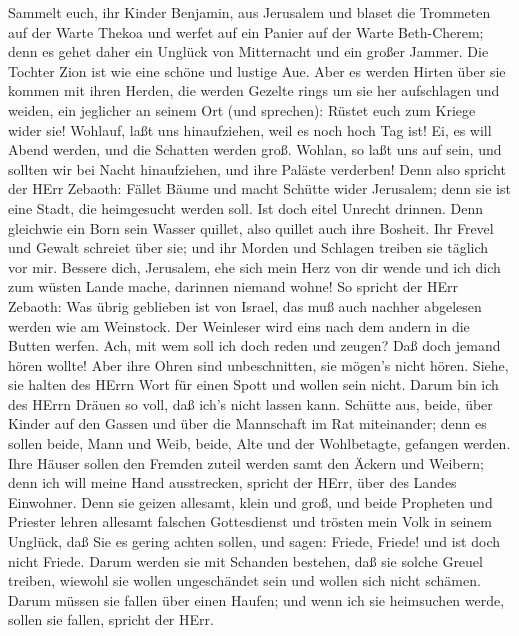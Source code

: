  Sammelt euch, ihr Kinder Benjamin, aus Jerusalem und blaset
die Trommeten auf der Warte Thekoa und werfet auf ein Panier auf der
Warte Beth-Cherem; denn es gehet daher ein Unglück von Mitternacht und
ein großer Jammer.  Die Tochter Zion ist wie eine schöne und
lustige Aue.  Aber es werden Hirten über sie kommen mit
ihren Herden, die werden Gezelte rings um sie her aufschlagen und
weiden, ein jeglicher an seinem Ort (und sprechen):  Rüstet
euch zum Kriege wider sie! Wohlauf, laßt uns hinaufziehen, weil es noch
hoch Tag ist! Ei, es will Abend werden, und die Schatten werden groß.
 Wohlan, so laßt uns auf sein, und sollten wir bei Nacht
hinaufziehen, und ihre Paläste verderben!  Denn also spricht
der HErr Zebaoth: Fället Bäume und macht Schütte wider Jerusalem; denn
sie ist eine Stadt, die heimgesucht werden soll. Ist doch eitel Unrecht
drinnen.  Denn gleichwie ein Born sein Wasser quillet, also
quillet auch ihre Bosheit. Ihr Frevel und Gewalt schreiet über sie; und
ihr Morden und Schlagen treiben sie täglich vor mir. 
Bessere dich, Jerusalem, ehe sich mein Herz von dir wende und ich dich
zum wüsten Lande mache, darinnen niemand wohne!  So spricht
der HErr Zebaoth: Was übrig geblieben ist von Israel, das muß auch
nachher abgelesen werden wie am Weinstock. Der Weinleser wird eins nach
dem andern in die Butten werfen.  Ach, mit wem soll ich
doch reden und zeugen? Daß doch jemand hören wollte! Aber ihre Ohren
sind unbeschnitten, sie mögen's nicht hören. Siehe, sie halten des HErrn
Wort für einen Spott und wollen sein nicht.  Darum bin ich
des HErrn Dräuen so voll, daß ich's nicht lassen kann. Schütte aus,
beide, über Kinder auf den Gassen und über die Mannschaft im Rat
miteinander; denn es sollen beide, Mann und Weib, beide, Alte und der
Wohlbetagte, gefangen werden.  Ihre Häuser sollen den
Fremden zuteil werden samt den Äckern und Weibern; denn ich will meine
Hand ausstrecken, spricht der HErr, über des Landes Einwohner.
 Denn sie geizen allesamt, klein und groß, und beide
Propheten und Priester lehren allesamt falschen Gottesdienst
 und trösten mein Volk in seinem Unglück, daß Sie es gering
achten sollen, und sagen: Friede, Friede! und ist doch nicht Friede.
 Darum werden sie mit Schanden bestehen, daß sie solche
Greuel treiben, wiewohl sie wollen ungeschändet sein und wollen sich
nicht schämen. Darum müssen sie fallen über einen Haufen; und wenn ich
sie heimsuchen werde, sollen sie fallen, spricht der HErr. 
